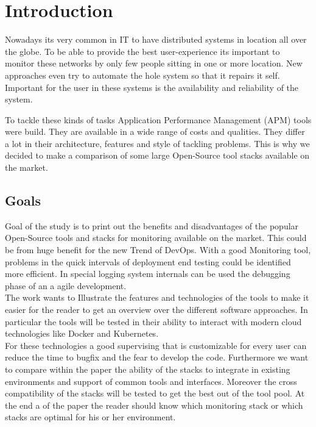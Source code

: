 
\chapter{Introduction}
Nowadays its very common in IT to have distributed systems in location all over the globe. To be able to provide the best user-experience its important to monitor these networks by only few people sitting in one or more location. New approaches even try to automate the hole system so that it repairs it self. Important for the user in these systems is the availability and reliability of the system. 

To tackle these kinds of tasks Application Performance Management (APM) tools were build. They are available in a wide range of costs and qualities. They differ a lot in their architecture, features and style of tackling problems. This is why we decided to make a comparison of some large Open-Source tool stacks available on the market. 
\section*{Goals}
Goal of the study is to print out the benefits and disadvantages of the popular Open-Source tools and stacks for monitoring available on the market. This could be from huge benefit for the new Trend of DevOps. With a good Monitoring tool, problems in the quick intervals of deployment end testing could be identified more efficient. In special logging system internals can be used the debugging phase of an a agile development.  
\\ The work wants to Illustrate the features and technologies of the tools to make it easier for the reader to get an overview over the different software approaches. In particular the tools will be tested in their ability to interact with modern cloud technologies like Docker and Kubernetes.\\
For these technologies a good supervising that is customizable for every user can reduce the time to bugfix and the fear to develop the code.
 Furthermore we want to compare within the paper the ability of the stacks to integrate in existing environments and support of common tools and interfaces. Moreover the cross compatibility of the stacks will be tested to get the best out of the tool pool. At the end a of the paper the reader should know which monitoring stack or which stacks are optimal for his or her environment.  

